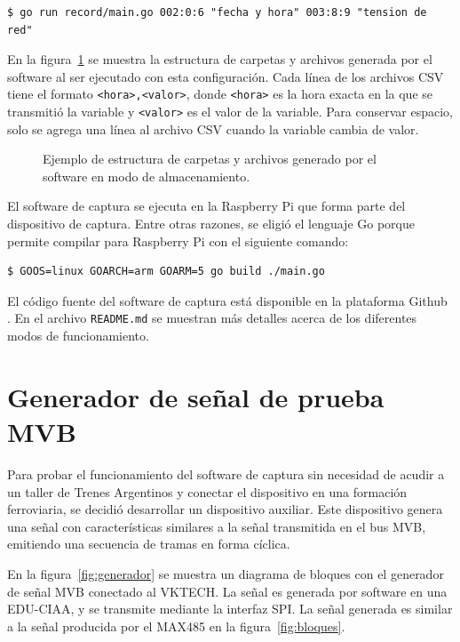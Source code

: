 \begin{lstlisting}
$ go run record/main.go 002:0:6 "fecha y hora" 003:8:9 "tension de red"
\end{lstlisting}

\pagebreak

En la figura~\ref{fig:carpetas} se muestra la estructura de carpetas y archivos generada por el software al ser ejecutado con esta configuración.
Cada línea de los archivos CSV tiene el formato \texttt{<hora>,\allowbreak <valor>}, donde \texttt{<hora>} es la hora exacta en la que se transmitió la variable y \texttt{<valor>} es el valor de la variable.
Para conservar espacio, solo se agrega una línea al archivo CSV cuando la variable cambia de valor.

\begin{figure}[htbp]
	\centering
    {
        \ttfamily
        \fontsize{8pt}{8pt}\selectfont
        
    }
	\caption{Ejemplo de estructura de carpetas y archivos generado por el software en modo de almacenamiento.}
    \label{fig:carpetas}
\end{figure}

El software de captura se ejecuta en la Raspberry Pi que forma parte del dispositivo de captura.
Entre otras razones, se eligió el lenguaje Go porque permite compilar para Raspberry Pi con el siguiente comando:

\begin{lstlisting}
$ GOOS=linux GOARCH=arm GOARM=5 go build ./main.go
\end{lstlisting}

El código fuente del software de captura está disponible en la plataforma Github \cite{mvbparse-go}.
En el archivo \texttt{README.md} se muestran más detalles acerca de los diferentes modos de funcionamiento.

\section{Generador de señal de prueba MVB}
\label{sec:generador}

Para probar el funcionamiento del software de captura sin necesidad de acudir a un taller de Trenes Argentinos y conectar el dispositivo en una formación ferroviaria, se decidió desarrollar un dispositivo auxiliar. Este dispositivo genera una señal con características similares a la señal transmitida en el bus MVB, emitiendo una secuencia de tramas en forma cíclica.

En la figura~\ref{fig:generador} se muestra un diagrama de bloques con el generador de señal MVB conectado al VKTECH. La señal es generada por software en una EDU-CIAA, y se transmite mediante la interfaz SPI. La señal generada es similar a la señal producida por el MAX485 en la figura~\ref{fig:bloques}.

